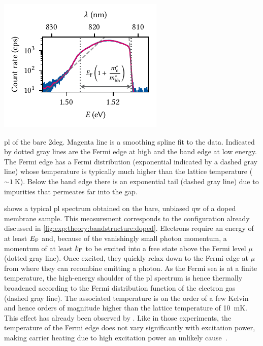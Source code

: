 \begin{marginfigure}
    \centering
    \includegraphics{img/pdf/experiment/2deg_pl}
    \caption[
        .
        \protect\newline
    ]{
        \Gls{pl} of the bare \gls{2deg}.
        Magenta line is a smoothing spline fit to the data.
        Indicated by dotted gray lines are the Fermi edge at high and the band edge at low energy.
        The Fermi edge has a Fermi distribution (exponential indicated by a dashed gray line) whose temperature is typically much higher than the lattice temperature ($\sim\qty{1}{\kelvin}$).
        Below the band edge there is an exponential tail (dashed gray line) due to impurities that permeates far into the gap.
    }
    \label{fig:exp:pl:2deg}
\end{marginfigure}

 shows a typical \gls{pl} spectrum obtained on the bare, unbiased \gls{qw} of a doped membrane sample.
This measurement corresponds to the configuration already discussed in \cref{fig:exp:theory:bandstructure:doped}.
Electrons require an energy of at least $E_{\mathrm{F}}$ and, because of the vanishingly small photon momentum, a momentum of at least $k_{\mathrm{F}}$ to be excited into a free state above the Fermi level $\mu$ (dotted gray line).
Once excited, they quickly relax down to the Fermi edge at $\mu$ from where they can recombine emitting a photon.
As the Fermi sea is at a finite temperature, the high-energy shoulder of the \gls{pl} spectrum is hence thermally broadened according to the Fermi distribution function of the electron gas (dashed gray line).
The associated temperature is on the order of a few Kelvin and hence orders of magnitude higher than the lattice temperature of \qty{10}{\milli\kelvin}. %
This effect has already been observed by \citet{Pinczuk1984}.
Like in those experiments, the temperature of the Fermi edge does not vary significantly with excitation power, making carrier heating due to high excitation power an unlikely cause~\cite{Ulbrich1973}.

